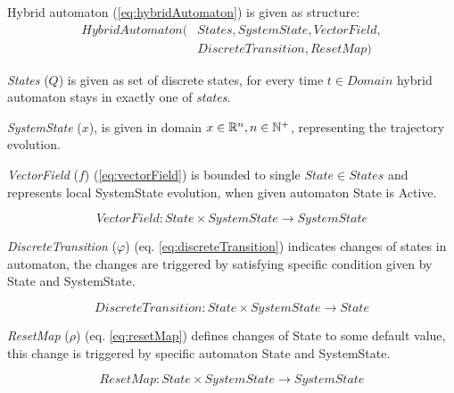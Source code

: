     \begin{definition}{Hybrid automaton} (\ref{eq:hybridAutomaton}) is given as structure:
        \begin{equation}\label{eq:hybridAutomaton}
        \begin{aligned}
            HybridAutomaton(&States,SystemState,VectorField,\\
                            &DiscreteTransition,ResetMap)
        \end{aligned}
        \end{equation}
    
        \emph{States} ($Q$) is given as set of discrete states, for every time $t\in Domain$ hybrid automaton stays in exactly one of \emph{states}.
    
        \emph{SystemState} ($x$), is given in domain $x\in\mathbb{R}^n,n\in\mathbb{N}^+$, representing the trajectory evolution.
        
        \emph{VectorField} ($f$) (\ref{eq:vectorField}) is bounded to single $State\in States$ and represents local SystemState evolution, when given automaton State is Active.
        
        \begin{equation}\label{eq:vectorField}
            VectorField: State\times SystemState \to SystemState
        \end{equation}
        
        \emph{DiscreteTransition} ($\varphi$) (eq. \ref{eq:discreteTransition}) indicates changes of states in automaton, the changes are triggered by satisfying specific condition given by State and SystemState. 
        
        \begin{equation}\label{eq:discreteTransition}
            DiscreteTransition:State\times SystemState \to State
        \end{equation}
        
        \emph{ResetMap} ($\rho$) (eq. \ref{eq:resetMap}) defines changes of State to some default value, this change is triggered by specific automaton State and SystemState.
        
        \begin{equation}\label{eq:resetMap}
            ResetMap:State\times SystemState \to SystemState
        \end{equation}
    
    \end{definition}

